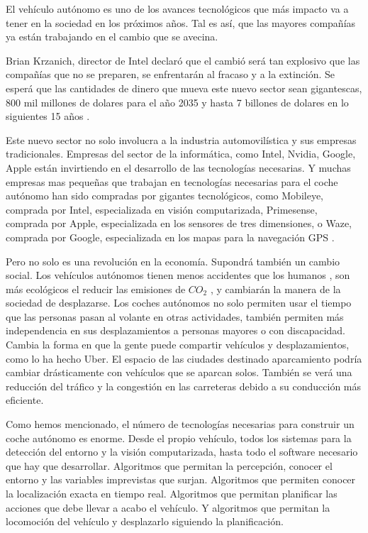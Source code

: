 
El vehículo autónomo es uno de los avances tecnológicos que más impacto va a tener en la sociedad en los próximos años. Tal es así, que las mayores compañías ya están trabajando en el cambio que se avecina.

Brian Krzanich, director de Intel declaró \cite{webtelegraphselfdrivingcars} que el cambió será tan explosivo que las compañías que no se preparen, se enfrentarán al fracaso y a la extinción. Se esperá que las cantidades de dinero que mueva este nuevo sector sean gigantescas, 800 mil millones de dolares para el año 2035 y hasta 7 billones de dolares en lo siguientes 15 años \cite{webtelegraphselfdrivingcars}.

Este nuevo sector no solo involucra a la industria automovilística y sus empresas tradicionales. Empresas del sector de la informática, como Intel, Nvidia, Google, Apple están invirtiendo en el desarrollo de las tecnologías necesarias. Y muchas empresas mas pequeñas que trabajan en tecnologías necesarias para el coche autónomo han sido compradas por gigantes tecnológicos, como Mobileye, comprada por Intel, especializada en visión computarizada, Primesense, comprada por Apple, especializada en los sensores de tres dimensiones, o Waze, comprada por Google, especializada en los mapas para la navegación GPS \cite{webtechcrunchselfdrivingcars}.

Pero no solo es una revolución en la economía. Supondrá también un cambio social. Los vehículos autónomos tienen menos accidentes que los humanos \cite{webfastcompanyselfdrivingcars}, son más ecológicos el reducir las emisiones de $CO_2$ \cite{webbusinessinsiderdrivingcars}, y cambiarán la manera de la sociedad de desplazarse. Los coches autónomos no solo permiten usar el tiempo que las personas pasan al volante en otras actividades, también permiten más independencia en sus desplazamientos a personas mayores o con discapacidad. Cambia la forma en que la gente puede compartir vehículos y desplazamientos, como lo ha hecho Uber. El espacio de las ciudades destinado aparcamiento podría cambiar drásticamente con vehículos que se aparcan solos. También se verá una reducción del tráfico y la congestión en las carreteras debido a su conducción más eficiente.

Como hemos mencionado, el número de tecnologías necesarias para construir un coche autónomo es enorme. Desde el propio vehículo, todos los sistemas para la detección del entorno y la visión computarizada, hasta todo el software necesario que hay que desarrollar. Algoritmos que permitan la percepción, conocer el entorno y las variables imprevistas que surjan. Algoritmos que permiten conocer la localización exacta en tiempo real. Algoritmos que permitan planificar las acciones que debe llevar a acabo el vehículo. Y algoritmos que permitan la locomoción del vehículo y desplazarlo siguiendo la planificación.


